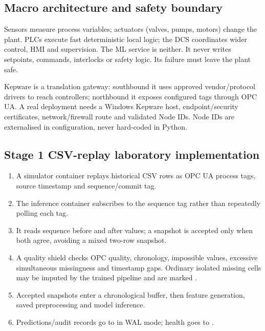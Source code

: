\documentclass[10pt,a4paper]{article}
\begin{document}
\subsection{Macro architecture and safety boundary}
\begin{center}\end{center}

Sensors measure process variables; actuators (valves, pumps, motors) change the plant. PLCs execute fast deterministic local logic; the DCS coordinates wider control, HMI and supervision. The ML service is neither. It never writes setpoints, commands, interlocks or safety logic. Its failure must leave the plant safe.

Kepware is a translation gateway: southbound it uses approved vendor/protocol drivers to reach controllers; northbound it exposes configured tags through OPC UA. A real deployment needs a Windows Kepware host, endpoint/security certificates, network/firewall route and validated Node IDs. Node IDs are externalised in configuration, never hard-coded in Python.

\subsection{Stage 1 CSV-replay laboratory implementation}
\begin{enumerate}
\item A simulator container replays historical CSV rows as OPC UA process tags, source timestamp and sequence/commit tag.
\item The inference container subscribes to the sequence tag rather than repeatedly polling each tag.
\item It reads sequence before and after values; a snapshot is accepted only when both agree, avoiding a mixed two-row snapshot.
\item A quality shield checks OPC quality, chronology, impossible values, excessive simultaneous missingness and timestamp gaps. Ordinary isolated missing cells may be imputed by the trained pipeline and are marked .
\item Accepted snapshots enter a chronological buffer, then feature generation, saved preprocessing and model inference.
\item Predictions/audit records go to  in WAL mode; health goes to .\end{enumerate}
\end{document}
